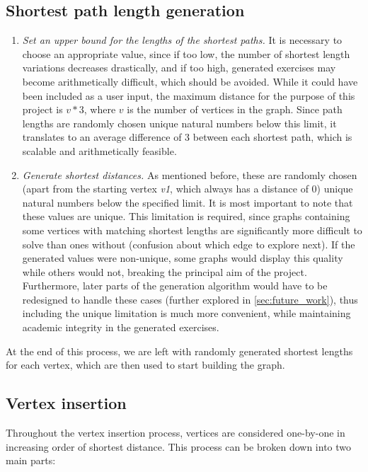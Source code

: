 \documentclass{l4proj}
\begin{document}
\subsection{Shortest path length generation}
\label{sec:shortestpathdesign}
\begin{enumerate}[i]
	\item
	\emph{Set an upper bound for the lengths of the shortest paths.} It is necessary to choose an appropriate value, since if too low, the number of shortest length variations decreases drastically, and if too high, generated exercises may become arithmetically difficult, which should be avoided. While it could have been included as a user input, the maximum distance for the purpose of this project is $v*3$, where $v$ is the number of vertices in the graph. Since path lengths are randomly chosen unique natural numbers below this limit, it translates to an average difference of $3$ between each shortest path, which is scalable and arithmetically feasible.

	\item
	\emph{Generate shortest distances.} As mentioned before, these are randomly chosen (apart from the starting vertex \emph{v1}, which always has a distance of $0$) unique natural numbers below the specified limit. It is most important to note that these values are unique. This limitation is required, since graphs containing some vertices with matching shortest lengths are significantly more difficult to solve than ones without (confusion about which edge to explore next). If the generated values were non-unique, some graphs would display this quality while others would not, breaking the principal aim of the project. Furthermore, later parts of the generation algorithm would have to be redesigned to handle these cases (further explored in \autoref{sec:future_work}), thus including the unique limitation is much more convenient, while maintaining academic integrity in the generated exercises.
\end{enumerate}

At the end of this process, we are left with randomly generated shortest lengths for each vertex, which are then used to start building the graph.

\subsection{Vertex insertion}
\label{sec:vi}

Throughout the vertex insertion process, vertices are considered one-by-one in increasing order of shortest distance. This process can be broken down into two main parts:
\end{document}
